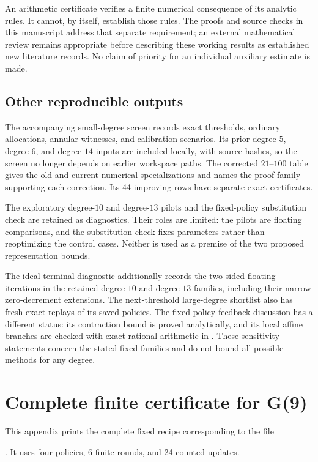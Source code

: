 \documentclass[11pt,letterpaper]{article}
\numberwithin{equation}{section}
\begin{document}
An arithmetic certificate verifies a finite numerical consequence of its
analytic rules. It cannot, by itself, establish those rules. The proofs
and source checks in this manuscript address that separate requirement;
an external mathematical review remains appropriate before describing
these working results as established new literature records. No claim of
priority for an individual auxiliary estimate is made.

\subsection{Other reproducible outputs}

The accompanying small-degree screen records exact thresholds, ordinary
allocations, annular witnesses, and calibration scenarios. Its prior
degree-$5$, degree-$6$, and degree-$14$ inputs are included locally, with
source hashes, so the screen no longer depends on earlier workspace paths.
The corrected $21$--$100$ table gives the old and current numerical
specializations and names the proof family supporting each correction.
Its 44 improving rows have separate exact certificates.

The exploratory degree-$10$ and degree-$13$ pilots and the fixed-policy substitution check
are retained as diagnostics. Their roles are limited: the pilots are
floating comparisons, and the substitution check fixes parameters rather than
reoptimizing the control cases. Neither is used as a premise of the two
proposed representation bounds.

The ideal-terminal diagnostic additionally records the two-sided floating
iterations in the retained degree-$10$ and degree-$13$ families, including
their narrow zero-decrement extensions. The next-threshold large-degree
shortlist also has fresh exact replays of its saved policies. The
fixed-policy feedback discussion has a different status: its contraction
bound is proved analytically, and its local affine branches are checked
with exact rational arithmetic in . These
sensitivity statements concern the stated fixed families and do not bound
all possible methods for any degree.

\par\bigskip{}

\clearpage\appendix

\section{Complete finite certificate for G(9)}
\label{app:g9-parameters}
This appendix prints the complete fixed recipe corresponding to the file
\par
{}.
It uses four policies, 6 finite rounds, and 24 counted updates.
\end{document}
